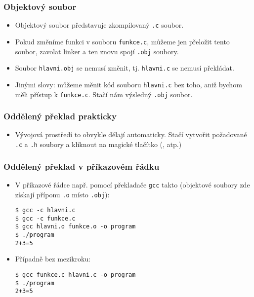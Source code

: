 \documentclass{beamer}
\newenvironment{itemizex}%
  {\large \begin{itemize}%
    \setlength{\itemsep}{8pt}%
    \setlength{\parskip}{8pt}}%
  {\end{itemize}}
\begin{document}
\begin{frame}[t,fragile]\frametitle{Objektový soubor} 
    \begin{itemizex}
        \item Objektový soubor představuje zkompilovaný \texttt{.c} soubor. 
        \item Pokud změníme funkci v souboru \texttt{funkce.c}, můžeme jen přeložit tento soubor, zavolat linker a ten znovu spojí \texttt{.obj} soubory.
        \item Soubor \texttt{hlavni.obj} se nemusí změnit, tj. \texttt{hlavni.c} se nemusí překládat. 
        \item Jinými slovy: můžeme měnit kód souboru \texttt{hlavni.c} bez toho, aniž bychom měli přístup k \texttt{funkce.c}. Stačí nám výsledný \texttt{.obj} soubor.
    \end{itemizex}
\end{frame}


\begin{frame}[t,fragile]\frametitle{Oddělený překlad prakticky} 
    \begin{itemizex}
        \item Vývojová prostředí to obvykle dělají automaticky. Stačí vytvořit požadované \texttt{.c} a \texttt{.h} soubory a kliknout na magické tlačítko (,  atp.)
    \end{itemizex}
\end{frame}


\begin{frame}[t,fragile]\frametitle{Oddělený překlad v příkazovém řádku} 
    \begin{itemizex}
        \item V příkazové řádce např. pomocí překladače \texttt{gcc} takto (objektové soubory zde získají příponu \texttt{.o} místo \texttt{.obj}):
\begin{verbatim} 
$ gcc -c hlavni.c
$ gcc -c funkce.c
$ gcc hlavni.o funkce.o -o program
$ ./program
2+3=5
\end{verbatim}
        \item Případně bez mezikroku: 
\begin{verbatim} 
$ gcc funkce.c hlavni.c -o program
$ ./program
2+3=5
\end{verbatim}
    \end{itemizex}
\end{frame}
\end{document}
